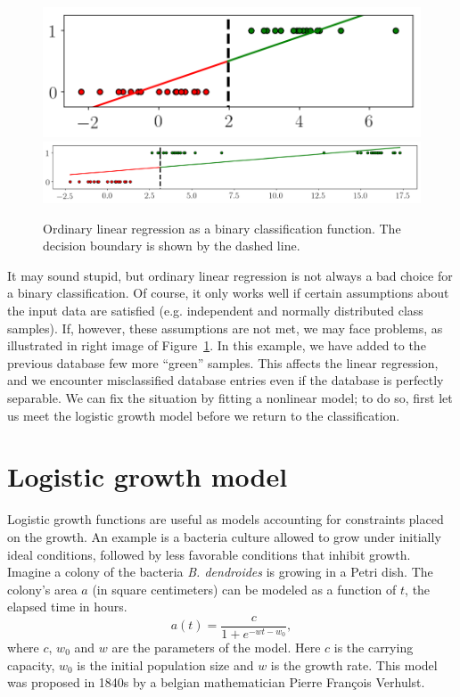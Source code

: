 \documentclass[notitlepage,oneside]{book}
\begin{document}
\begin{figure}[htb]
    \centering
    \includegraphics[width=.305\linewidth]{img/linear-1d-a.png}
    \includegraphics[width=.64\linewidth]{img/linear-1d-b.png}
    \caption{Ordinary linear regression as a binary classification function. The decision boundary is shown by the dashed line.}
    \label{fig:linear-regression-classification}
\end{figure}

It may sound stupid, but ordinary linear regression is not always a bad choice for a binary classification.
Of course, it only works well if certain assumptions about the input data are satisfied (e.g. independent and normally distributed class samples).
If, however, these assumptions are not met, we may face problems, as illustrated in right image of Figure~\ref{fig:linear-regression-classification}.
In this example, we have added to the previous database few more ``green'' samples. This affects the linear regression, and we encounter misclassified
database entries even if the database is perfectly separable. We can fix the situation by fitting a nonlinear model; to do so, first let us meet the logistic growth model
before we return to the classification.


\section{Logistic growth model}
\label{sec:logistic-growth}
Logistic growth functions are useful as models accounting for constraints placed on the growth.
An example is a bacteria culture allowed to grow under initially ideal conditions, followed by less favorable conditions that inhibit growth.
Imagine a colony of the bacteria \textit{B. dendroides} is growing in a Petri dish. The colony's area $a$ (in square centimeters) can be modeled as a function of $t$, the elapsed time in hours.
\begin{equation}
\label{eq:logistic-growth}
a(t) = \frac{c}{1+e^{-wt - w_0}},
\end{equation}
where $c$, $w_0$ and $w$ are the parameters of the model. Here $c$ is the carrying capacity, $w_0$ is the initial population size and $w$ is the growth rate.
This model was proposed in 1840s by a belgian mathematician Pierre François Verhulst.
\end{document}
